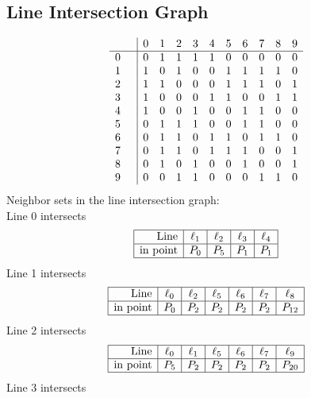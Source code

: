 \documentclass{article}
\begin{document}
{\subsection*{Line Intersection Graph}
{\arraycolsep=1pt
$$
\begin{array}{rr|*{10}r}
 &  & 0 & 1 & 2 & 3 & 4 & 5 & 6 & 7 & 8 & 9\\
\hline
0 &  & 0 & 1 & 1 & 1 & 1 & 0 & 0 & 0 & 0 & 0\\
1 &  & 1 & 0 & 1 & 0 & 0 & 1 & 1 & 1 & 1 & 0\\
2 &  & 1 & 1 & 0 & 0 & 0 & 1 & 1 & 1 & 0 & 1\\
3 &  & 1 & 0 & 0 & 0 & 1 & 1 & 0 & 0 & 1 & 1\\
4 &  & 1 & 0 & 0 & 1 & 0 & 0 & 1 & 1 & 0 & 0\\
5 &  & 0 & 1 & 1 & 1 & 0 & 0 & 1 & 1 & 0 & 0\\
6 &  & 0 & 1 & 1 & 0 & 1 & 1 & 0 & 1 & 1 & 0\\
7 &  & 0 & 1 & 1 & 0 & 1 & 1 & 1 & 0 & 0 & 1\\
8 &  & 0 & 1 & 0 & 1 & 0 & 0 & 1 & 0 & 0 & 1\\
9 &  & 0 & 0 & 1 & 1 & 0 & 0 & 0 & 1 & 1 & 0\\
\end{array}
$$
}%
Neighbor sets in the line intersection graph:\\
Line 0 intersects 
$$
\begin{array}{|r*{4}{|c}|}
\hline
\mbox{Line}  & \ell_{1} & \ell_{2} & \ell_{3} & \ell_{4}\\
\hline
\mbox{in point}  & P_{0} & P_{5} & P_{1} & P_{1}\\
\hline
\end{array}
$$
Line 1 intersects 
$$
\begin{array}{|r*{6}{|c}|}
\hline
\mbox{Line}  & \ell_{0} & \ell_{2} & \ell_{5} & \ell_{6} & \ell_{7} & \ell_{8}\\
\hline
\mbox{in point}  & P_{0} & P_{2} & P_{2} & P_{2} & P_{2} & P_{12}\\
\hline
\end{array}
$$
Line 2 intersects 
$$
\begin{array}{|r*{6}{|c}|}
\hline
\mbox{Line}  & \ell_{0} & \ell_{1} & \ell_{5} & \ell_{6} & \ell_{7} & \ell_{9}\\
\hline
\mbox{in point}  & P_{5} & P_{2} & P_{2} & P_{2} & P_{2} & P_{20}\\
\hline
\end{array}
$$
Line 3 intersects 
$$
\begin{array}{|r*{5}{|c}|}

\end{array}$$}
\end{document}
